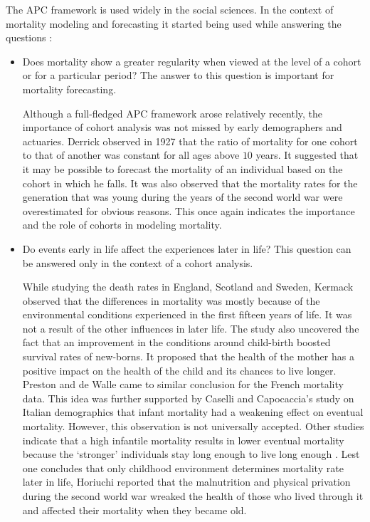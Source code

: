 \documentclass{article}
\numberwithin{equation}{section}
\begin{document}
The APC framework is used widely in the social sciences. In the context of
mortality modeling and forecasting it started being used while answering the
questions \cite{willekens1991age}:
\begin{itemize}
\item Does mortality show a greater regularity when viewed at the level of a
cohort or for a particular period? The answer to this question is important
for mortality forecasting.

Although a full-fledged APC framework arose relatively recently, the importance
of cohort analysis was not missed by early demographers and actuaries. Derrick
\cite{derrick1927observations} observed in 1927 that the ratio of mortality
for one cohort to that of another was constant for all ages above $10$ years.
It suggested that it may be possible to forecast the mortality of an individual
based on the cohort in which he falls. It was also observed that the mortality
rates for the generation that was young during the years of the second world
war were overestimated for obvious reasons. This once again indicates the 
importance and the role of cohorts in modeling mortality. 

\item Do events early in life affect the experiences later in life? This 
question can be answered only in the context of a cohort analysis.

While studying the death rates in England, Scotland and Sweden, Kermack
\cite{kermack1934death} observed that the differences in mortality was mostly
because of the environmental conditions experienced in the first fifteen years
of life. It was not a result of the other influences in later life. The 
study also uncovered the fact that an improvement in the conditions around
child-birth boosted survival rates of new-borns. It proposed that the health
of the mother has a positive impact on the health of the child and its chances
to live longer. Preston and de Walle \cite{preston1978urban} came to similar
conclusion for the French mortality data. This idea was further supported by 
Caselli and Capocaccia's study\cite{caselli1989age} on Italian demographics 
that infant mortality had a weakening effect on eventual mortality. However, 
this observation is not universally accepted. Other studies indicate that a 
high infantile mortality results in lower eventual mortality because the 
`stronger' individuals stay long enough to live long enough 
\cite{manton1981methods}. Lest one concludes that only childhood environment
determines mortality rate later in life, Horiuchi reported 
\cite{horiuchi1983long} that the malnutrition and physical privation during the
second world war wreaked the health of those who lived through it and affected
their mortality when they became old.
\end{itemize}
\end{document}
